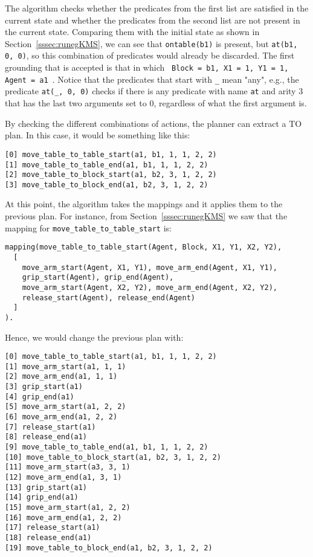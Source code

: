The algorithm checks whether the predicates from the first list are satisfied in the current state and whether the predicates from the second list are not present in the current state. Comparing them with the initial state as shown in Section~\ref{sssec:runegKMS}, we can see that \verb|ontable(b1)| is present, but \verb|at(b1, 0, 0)|, so this combination of predicates would already be discarded. The first grounding that is accepted is that in which \verb | Block = b1, X1 = 1, Y1 = 1, Agent = a1 |. Notice that the predicates that start with \verb|_| mean "any", e.g., the predicate \verb|at(_, 0, 0)| checks if there is any predicate with name \verb|at| and arity 3 that has the last two arguments set to 0, regardless of what the first argument is.

By checking the different combinations of actions, the planner can extract a \HL TO plan. In this case, it would be something like this:

\begin{verbatim}
[0] move_table_to_table_start(a1, b1, 1, 1, 2, 2)
[1] move_table_to_table_end(a1, b1, 1, 1, 2, 2)
[2] move_table_to_block_start(a1, b2, 3, 1, 2, 2)
[3] move_table_to_block_end(a1, b2, 3, 1, 2, 2)
\end{verbatim}

At this point, the algorithm takes the mappings and it applies them to the previous plan. For instance, from Section~\ref{sssec:runegKMS} we saw that the mapping for \verb|move_table_to_table_start| is:
\begin{verbatim}
mapping(move_table_to_table_start(Agent, Block, X1, Y1, X2, Y2),
  [
    move_arm_start(Agent, X1, Y1), move_arm_end(Agent, X1, Y1),
    grip_start(Agent), grip_end(Agent),
    move_arm_start(Agent, X2, Y2), move_arm_end(Agent, X2, Y2),
    release_start(Agent), release_end(Agent)
  ]
).
\end{verbatim}

Hence, we would change the previous plan with:

\begin{verbatim}
[0] move_table_to_table_start(a1, b1, 1, 1, 2, 2)
[1] move_arm_start(a1, 1, 1)
[2] move_arm_end(a1, 1, 1)
[3] grip_start(a1)
[4] grip_end(a1)
[5] move_arm_start(a1, 2, 2)
[6] move_arm_end(a1, 2, 2)
[7] release_start(a1)
[8] release_end(a1)
[9] move_table_to_table_end(a1, b1, 1, 1, 2, 2)
[10] move_table_to_block_start(a1, b2, 3, 1, 2, 2)
[11] move_arm_start(a3, 3, 1)
[12] move_arm_end(a1, 3, 1)
[13] grip_start(a1)
[14] grip_end(a1)
[15] move_arm_start(a1, 2, 2)
[16] move_arm_end(a1, 2, 2)
[17] release_start(a1)
[18] release_end(a1)
[19] move_table_to_block_end(a1, b2, 3, 1, 2, 2)
\end{verbatim}

